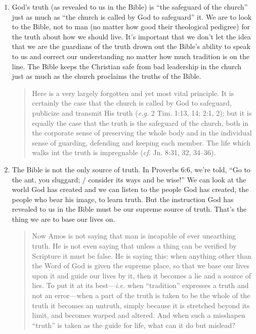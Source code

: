 \begin{enumerate}
    \item God's truth (as revealed to us in the Bible) is \enquote{the safeguard
        of the church} just as much as \enquote{the church is called by God to
        safeguard} it. We are to look to the Bible, not to man (no matter how
        good their theological pedigree) for the truth about how we should live.
        It's important that we don't let the idea that we are the guardians of
        the truth drown out the Bible's ability to speak to us and correct our
        understanding no matter how much tradition is on the line. The Bible
        keeps the Christian safe from bad leadership in the church just as much
        as the church proclaims the truths of the Bible.

        \begin{quote}
            Here is a very largely forgotten and yet most vital principle. It is
            certainly the case that the church is called by God to safeguard,
            publicize and transmit His truth (\textit{e.g.} 2 Tim. 1:13, 14;
            2:1, 2); but it is equally the case that the truth is the safeguard
            of the church, both in the corporate sense of preserving the whole
            body and in the individual sense of guarding, defending and keeping
            each member. The life which walks int the truth is impregnable
            (\textit{cf.} Jn. 8:31, 32, 34--36).
            \autocite[54]{motyer:2011}
        \end{quote}

    \item The Bible is not the only source of truth. In Proverbs 6:6, we're
        told, \enquote{Go to the ant, you sluggard; / consider its ways and be
        wise!} We can look at the world God has created and we can listen to the
        people God has created, the people who bear his image, to learn truth.
        But the instruction God has revealed to us in the Bible must be our
        supreme source of truth. That's the thing we are to base our lives on.

        \begin{quote}
            Now Amos is not saying that man is incapable of ever unearthing
            truth. He is not even saying that unless a thing can be verified by
            Scripture it must be false. He is saying this: when anything other
            than the Word of God is given the supreme place, so that we base our
            lives upon it and guide our lives by it, then it becomes a lie and a
            source of lies. To put it at its best---\textit{i.e.} when
            \enquote{tradition} expresses a truth and not an error---when a part
            of the truth is taken to be the whole of the truth it becomes an
            untruth, simply because it is stretched beyond its limit, and
            becomes warped and altered. And when such a misshapen
            \enquote{truth} is taken as the guide for life, what can it do but
            mislead?
            \autocite[54]{motyer:2011}
        \end{quote}
\end{enumerate}

